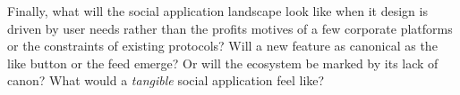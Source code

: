 Finally, what will the social application
landscape look like when it design is driven by user needs
rather than the profits motives of a few corporate platforms or
the constraints of existing protocols?
Will a new feature as canonical as the like button or the feed emerge?
Or will the ecosystem be marked by its lack of canon?
What would a \emph{tangible} social application feel like?














% 


